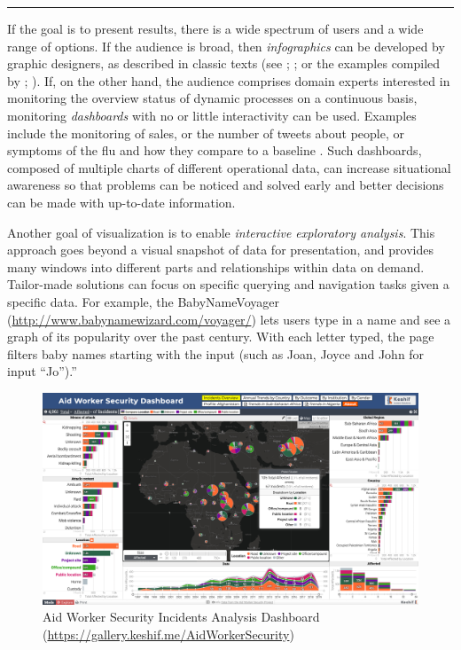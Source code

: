 \documentclass[]{krantz}
\begin{document}
\begin{center}\rule{0.5\linewidth}{\linethickness}\end{center}

If the goal is to present results, there is a wide spectrum of users and
a wide range of options. If the audience is broad, then
\emph{infographics} can be developed by graphic designers, as described
in classic texts (see \citet{few2009now}; \citet{edward2001visual};
\citet{edward2006beauty} or the examples compiled by
\citet{harrison2015infographic}; \citet{harrisonweb}). If, on the other
hand, the audience comprises domain experts interested in monitoring the
overview status of dynamic processes on a continuous basis, monitoring
\emph{dashboards} with no or little interactivity can be used. Examples
include the monitoring of sales, or the number of tweets about people,
or symptoms of the flu and how they compare to a baseline
\citep{few2013information}. Such dashboards, composed of multiple charts
of different operational data, can increase situational awareness so
that problems can be noticed and solved early and better decisions can
be made with up-to-date information.

Another goal of visualization is to enable \emph{interactive exploratory
analysis}. This approach goes beyond a visual snapshot of data for
presentation, and provides many windows into different parts and
relationships within data on demand. Tailor-made solutions can focus on
specific querying and navigation tasks given a specific data. For
example, the BabyNameVoyager
(\url{http://www.babynamewizard.com/voyager/}) lets users type in a name
and see a graph of its popularity over the past century. With each
letter typed, the page filters baby names starting with the input (such
as Joan, Joyce and John for input ``Jo'').''

\begin{figure}

{\centering \includegraphics[width=0.9\linewidth]{ChapterViz/figures/fig9-2a-new} 

}

\caption{Aid Worker Security Incidents Analysis Dashboard (\url{https://gallery.keshif.me/AidWorkerSecurity})}\label{fig:fig9-2a}
\end{figure}
\end{document}
